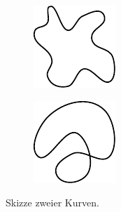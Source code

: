 \begin{figure}[h!]\label{im:chap3:jKurve}
\center
\begin{subfigure}[c]{.3\textwidth}
\includegraphics[width=.9\linewidth]{images/jKurve}
\end{subfigure}
\qquad
\begin{subfigure}[c]{.3\textwidth}
\includegraphics[width=.9\linewidth]{images/nJKurve}
\end{subfigure}
\caption{Skizze zweier Kurven.}
\end{figure}


